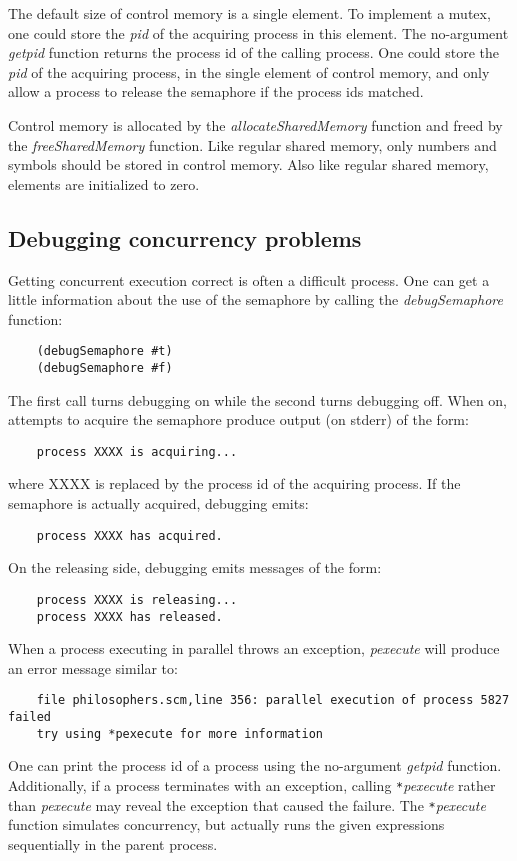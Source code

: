 The default size of control memory is a single element.
To implement a mutex, one could store the {\it pid} of the acquiring
process in this element.
The no-argument
{\it getpid} function returns the process id of the calling process.
One could store the {\it pid} of the acquiring process,
in the single element of control  memory, and only allow
a process to release the semaphore if the process ids matched.

Control memory is allocated by the {\it allocateSharedMemory} function
and freed by the {\it freeSharedMemory} function.
Like regular shared memory, only numbers and symbols
should be stored
in control memory. Also like regular shared memory, elements are initialized
to zero.

\subsection{Debugging concurrency problems}

Getting concurrent execution correct is often a difficult process.
One can get a little information about the use of the semaphore 
by calling the {\it debugSemaphore} function:

\begin{verbatim}
    (debugSemaphore #t)
    (debugSemaphore #f)
\end{verbatim}

The first call turns debugging on while the second turns debugging off. When
on, attempts to acquire the semaphore produce output (on stderr) of
the form:

\begin{verbatim}
    process XXXX is acquiring...
\end{verbatim}

where XXXX is replaced by the process id of the acquiring process.
If the semaphore is actually acquired, debugging emits:

\begin{verbatim}
    process XXXX has acquired.
\end{verbatim}

On the releasing side, debugging emits messages of the form:

\begin{verbatim}
    process XXXX is releasing...
    process XXXX has released.
\end{verbatim}

When a process executing in parallel throws an exception, {\it pexecute} will
produce an error message similar to:

\begin{verbatim}
    file philosophers.scm,line 356: parallel execution of process 5827 failed
    try using *pexecute for more information
\end{verbatim}

One can print the process id of a process
using the no-argument {\it getpid} function.
Additionally, if a process terminates with an exception,
calling \verb!*!{\it pexecute} rather than {\it pexecute} may reveal the
exception that caused the failure.
The \verb!*!{\it pexecute} function simulates concurrency, but actually runs the
given expressions sequentially in the parent process.
